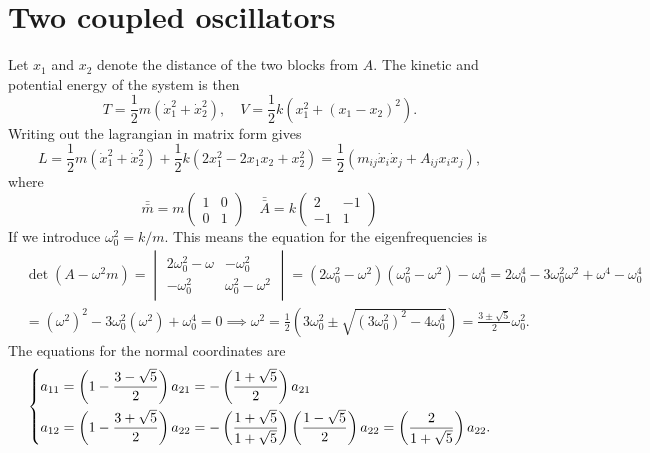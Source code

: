 \documentclass{article}
\begin{document}
    \section{Two coupled oscillators}
        Let $x_1$ and $x_2$ denote the distance of the two blocks from $A$. The kinetic and potential energy of the system is then
        \begin{equation*}
            T = \frac{1}{2}m(\dot x_1^2 + \dot x_2^2), \quad V = \frac{1}{2} k (x_1^2 + (x_1 - x_2)^2).
        \end{equation*}
        Writing out the lagrangian in matrix form gives
        \begin{equation*}
            L = \frac{1}{2}m(\dot x_1^2 + \dot x_2^2) + \frac{1}{2}k (2  x_1^2 - 2 x_1  x_2 + x_2^2) = \frac{1}{2}\left(m_{ij}\dot x_i \dot x_j + A_{ij} x_i x_j\right),
        \end{equation*}
        where
        \begin{equation*}
            \bar {\bar m} = m
            \begin{pmatrix}
                1 & 0 \\
                0 & 1 
            \end{pmatrix}
            \quad \bar {\bar A} = k
            \begin{pmatrix*}
                2 & -1 \\
                -1 & 1
            \end{pmatrix*}
        \end{equation*}
        If we introduce $\omega_0^2 = k/m$. This means the equation for the eigenfrequencies is
        \begin{align*} & \det(A - \omega^2m) = 
            \begin{vmatrix}
                2\omega_0^2 - \omega& -\omega_0^2 \\
                -\omega_0^2 & \omega_0^2 - \omega^2
            \end{vmatrix}
            = (2\omega_0^2 - \omega^2)(\omega_0^2 - \omega^2) - \omega_0^4 = 2\omega_0^4 - 3 \omega_0^2\omega^2 + \omega^4 - \omega_0^4 \\
            & = (\omega^2)^2 - 3\omega_0^2(\omega^2) + \omega_0^4 =0 \implies \omega^2 = \frac{1}{2} \left(3\omega_0^2 \pm \sqrt{(3\omega_0^2)^2 - 4\omega_0^4}\right) = \frac{3 \pm \sqrt{5}}{2}\omega_0^2.
        \end{align*}
        The equations for the normal coordinates are
        \begin{equation*}
            \begin{dcases*}
                a_{11} = \left(1 - \frac{3 - \sqrt{5}}{2}\right)a_{21} =-\left(\frac{1 + \sqrt{5}}{2}\right)a_{21}\\
                a_{12} = \left(1 - \frac{3 + \sqrt{5}}{2}\right)a_{22} = -\left(\frac{1+\sqrt5}{1+\sqrt 5}\right)\left(\frac{1 - \sqrt{5}}{2}\right)a_{22} = \left(\frac{2}{1 + \sqrt 5}\right) a_{22}.
            \end{dcases*}
        \end{equation*}
\end{document}

